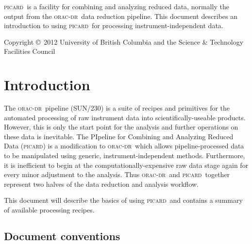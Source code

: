 \documentclass[twoside,11pt]{article}
\newcommand{\stardocinitials}  {SUN}
\newcommand{\stardoccopyright}
{Copyright \copyright\ 2012 University of British Columbia and the Science \& Technology Facilities Council}
\newcommand{\stardocnumber}    {265.0}
\newcommand{\stardocabstract}  {

  \picard\ is a facility for combining and analyzing reduced data,
  normally the output from the \oracdr\ data reduction pipeline. This
  document describes an introduction to using \picard\ for processing
  instrument-independent data.

}
\newcommand{\stardocname}{\stardocinitials /\stardocnumber}
\newenvironment{latexonly}{}{}
\newcommand{\xref}[3]{#1}
\newcommand{\xlabel}[1]{}
\renewcommand{\_}{\texttt{\symbol{95}}}
\newcommand{\oracdr}{\textsc{orac-dr}}
\newcommand{\oracsun}{\xref{SUN/230}{sun230}{}}
\newcommand{\picard}{\textsc{picard}}
\renewcommand{\thepage}{\roman{page}}
\begin{document}
\stardocabstract

\begin{latexonly}
\newpage
\vspace*{\fill}
\stardoccopyright
\end{latexonly}

  \newpage
  \begin{latexonly}
    \setlength{\parskip}{0mm}
    \tableofcontents
    \setlength{\parskip}{\medskipamount}
    \markboth{\stardocname}{\stardocname}
  \end{latexonly}

\cleardoublepage
\renewcommand{\thepage}{\arabic{page}}
\setcounter{page}{1}


\section{\xlabel{introduction}Introduction\label{se:intro}}

The \oracdr\ pipeline (\oracsun) is a suite of recipes and primitives
for the automated processing of raw instrument data into
scientifically-useable products. However, this is only the start point
for the analysis and further operations on these data is
inevitable. The PIpeline for Combining and Analyzing Reduced Data
(\picard) is a modification to \oracdr\ which allows
pipeline-processed data to be manipulated using generic,
instrument-independent methods. Furthermore, it is inefficient to
begin at the computationally-expensive raw data stage again for every
minor adjustment to the analysis. Thus \oracdr\ and \picard\ together
represent two halves of the data reduction and analysis workflow.

This document will describe the basics of using \picard\ and contains
a summary of available processing recipes.

\subsection{Document conventions}
\end{document}
